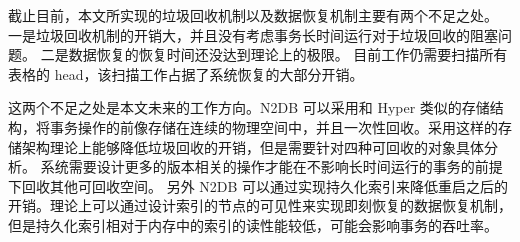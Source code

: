 截止目前，本文所实现的垃圾回收机制以及数据恢复机制主要有两个不足之处。
一是垃圾回收机制的开销大，并且没有考虑事务长时间运行对于垃圾回收的阻塞问题。
二是数据恢复的恢复时间还没达到理论上的极限。
目前工作仍需要扫描所有表格的 head，该扫描工作占据了系统恢复的大部分开销。

这两个不足之处是本文未来的工作方向。N2DB 可以采用和 Hyper 类似的存储结构，将事务操作的前像存储在连续的物理空间中，并且一次性回收。采用这样的存储架构理论上能够降低垃圾回收的开销，但是需要针对四种可回收的对象具体分析。
系统需要设计更多的版本相关的操作才能在不影响长时间运行的事务的前提下回收其他可回收空间。
另外 N2DB 可以通过实现持久化索引来降低重启之后的开销。理论上可以通过设计索引的节点的可见性来实现即刻恢复的数据恢复机制，但是持久化索引相对于内存中的索引的读性能较低，可能会影响事务的吞吐率。
